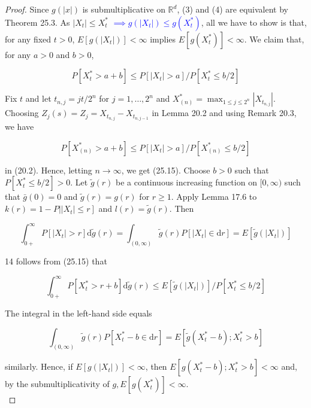 \documentclass[a4paper,11pt]{article}
\begin{document}
\begin{proof}
    Since $g(|x|)$ is submultiplicative on $\mathbb{R}^{d}$, (3) and (4) are equivalent by
    Theorem 25.3. As $\left|X_{t}\right| \leq X_{t}^{*}$ \textcolor{blue}{$ \implies g(\left|X_{t}\right|) \leq g(X_{t}^{*})$}, all we have to show is that, for
    any fixed $t>0$, $E\left[g\left(\left|X_{t}\right|\right)\right]<\infty$ implies
    $E\left[g\left(X_{t}^{*}\right)\right]<\infty$. We claim that, for any $a>0$ and $b>0$,

    \begin{equation*}
        P\left[X_{t}^{*}>a+b\right] \leq P\left[\left|X_{t}\right|>a\right] / P\left[X_{t}^{*} \leq b / 2\right] \tag{25.15}
    \end{equation*}

    Fix $t$ and let $t_{n, j}=j t / 2^{n}$ for $j=1, \ldots, 2^{n}$ and $X_{(n)}^{*}=\max _{1 \leq j \leq 2^{n}}\left|X_{t_{n, j}}\right|$. Choosing $Z_{j}(s)=Z_{j}=X_{t_{n, j}}-X_{t_{n, j-1}}$ in Lemma 20.2 and using Remark 20.3, we have

    $$
        P\left[X_{(n)}^{*}>a+b\right] \leq P\left[\left|X_{t}\right|>a\right] / P\left[X_{(n)}^{*} \leq b / 2\right]
    $$

    in (20.2). Hence, letting $n \rightarrow \infty$, we get (25.15).
    Choose $b>0$ such that $P\left[X_{t}^{*} \leq b / 2\right]>0$.
    Let $\tilde{g}(r)$ be a continuous increasing function on $[0, \infty)$
                    such that $\bar{g}(0)=0$ and $\tilde{g}(r)=g(r)$ for $r \geq 1$.
                    Apply Lemma 17.6 to $\left.k(r)=1-P|| X_{t} \mid \leq r\right]$ and $l(r)=\tilde{g}(r)$. Then

    $$
        \int_{0+}^{\infty} P\left[\left|X_{t}\right|>r\right] \mathrm{d} \tilde{g}(r)=\int_{(0, \infty)} \tilde{g}(r) P\left[\left|X_{t}\right| \in \mathrm{d} r\right]=E\left[\widetilde{g}\left(\left|X_{t}\right|\right)\right]
    $$

    14 follows from (25.15) that

    $$
        \int_{0+}^{\infty} P\left[X_{t}^{*}>r+b\right] \mathrm{d} \widetilde{g}(r) \leq E\left[\widetilde{g}\left(\left|X_{t}\right|\right)\right] / P\left[X_{t}^{*} \leq b / 2\right]
    $$

    The integral in the left-hand side equals

    $$
        \int_{(0, \infty)} \tilde{g}(r) P\left[X_{t}^{*}-b \in \mathrm{d} r\right]=E\left[\tilde{g}\left(X_{t}^{*}-b\right) ; X_{t}^{*}>b\right]
    $$

    similarly. Hence, if $E\left[g\left(\left|X_{t}\right|\right)\right]<\infty$,
    then $E\left[g\left(X_{t}^{*}-b\right) ; X_{t}^{*}>b\right]<\infty$ and,
    by the submultiplicativity of $g, E\left[g\left(X_{t}^{*}\right)\right]<\infty$. \\

\end{proof}

\printbibliography
\end{document}
